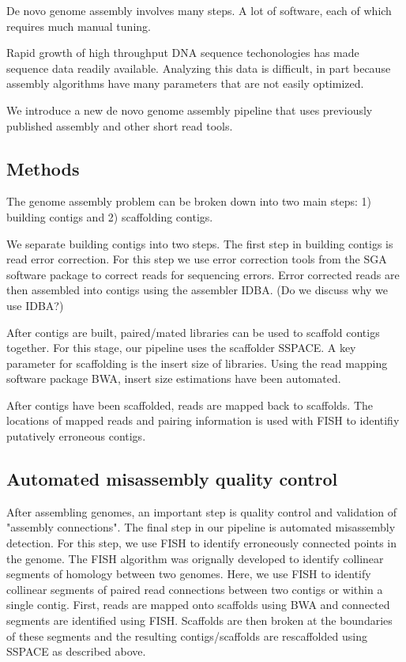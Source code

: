 \documentclass{bioinfo}
\begin{document}
De novo genome assembly involves many steps. A lot of software, each of which requires 
much manual tuning. 

Rapid growth of high throughput DNA sequence techonologies has made sequence 
data readily available. Analyzing this data is difficult, in part because 
assembly algorithms have many parameters that are not easily optimized. 

We introduce a new de novo genome assembly pipeline that uses previously 
published assembly and other short read tools.  

\begin{methods}
\section{Methods}
The genome assembly problem can be broken down into two main steps: 1) building
contigs and 2) scaffolding contigs. 

We separate building contigs into two steps. The first step in building contigs
is read error correction. For this step we use error correction tools from the
SGA software package to correct reads for sequencing errors. Error corrected reads
are then assembled into contigs using the assembler IDBA. (Do we discuss why we use IDBA?)  

After contigs are built, paired/mated libraries can be used to scaffold contigs 
together. For this stage, our pipeline uses the scaffolder SSPACE. A key 
parameter for scaffolding is the insert size of libraries. Using the read
mapping software package BWA, insert size estimations have been automated. 

After contigs have been scaffolded, reads are mapped back to scaffolds. The locations
of mapped reads and pairing information is used with FISH to identifiy putatively erroneous 
contigs. 



\end{methods}

\subsection{Automated misassembly quality control}

After assembling genomes, an important step is quality control and validation
of "assembly connections". The final step in our pipeline is automated 
misassembly detection. For this step, we use FISH to identify erroneously
connected points in the genome. The FISH algorithm was orignally developed
to identify collinear segments of homology between two genomes. Here, we use
FISH to identify collinear segments of paired read connections between two contigs
or within a single contig. First, reads are mapped onto scaffolds using BWA and 
connected segments are identified using 
FISH. Scaffolds are then broken at the boundaries of these segments and the 
resulting contigs/scaffolds are rescaffolded using SSPACE as described above.
\end{document}
